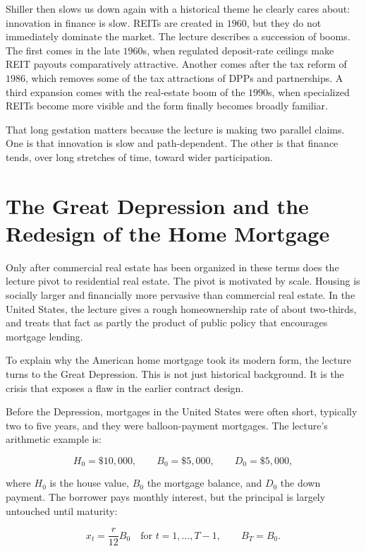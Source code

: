 Shiller then slows us down again with a historical theme he clearly cares about: innovation in finance is slow. REITs are created in \(1960\), but they do not immediately dominate the market. The lecture describes a succession of booms. The first comes in the late \(1960\)s, when regulated deposit-rate ceilings make REIT payouts comparatively attractive. Another comes after the tax reform of \(1986\), which removes some of the tax attractions of DPPs and partnerships. A third expansion comes with the real-estate boom of the \(1990\)s, when specialized REITs become more visible and the form finally becomes broadly familiar.

That long gestation matters because the lecture is making two parallel claims. One is that innovation is slow and path-dependent. The other is that finance tends, over long stretches of time, toward wider participation.

\section{The Great Depression and the Redesign of the Home Mortgage}

Only after commercial real estate has been organized in these terms does the lecture pivot to residential real estate. The pivot is motivated by scale. Housing is socially larger and financially more pervasive than commercial real estate. In the United States, the lecture gives a rough homeownership rate of about two-thirds, and treats that fact as partly the product of public policy that encourages mortgage lending.

To explain why the American home mortgage took its modern form, the lecture turns to the Great Depression. This is not just historical background. It is the crisis that exposes a flaw in the earlier contract design.

Before the Depression, mortgages in the United States were often short, typically two to five years, and they were balloon-payment mortgages. The lecture's arithmetic example is:

\begin{equation}
H_0 = \$10{,}000, \qquad B_0 = \$5{,}000, \qquad D_0 = \$5{,}000,
\end{equation}

where \(H_0\) is the house value, \(B_0\) the mortgage balance, and \(D_0\) the down payment. The borrower pays monthly interest, but the principal is largely untouched until maturity:

\begin{equation}
x_t = \frac{r}{12}B_0 \quad \text{for } t=1,\dots,T-1,
\qquad
B_T = B_0.
\end{equation}

